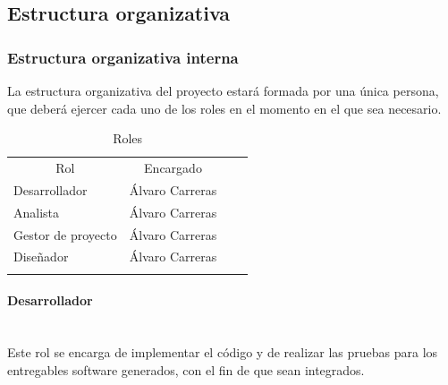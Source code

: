 \documentclass[twoside]{report}
\begin{document}
\subsection{Estructura organizativa}
\subsubsection{Estructura organizativa interna}
La estructura organizativa del proyecto estará formada por una única persona, que deberá ejercer cada uno de los roles en el momento en el que sea necesario. \cite{upedu} \vspace{0.5cm}

\begin{table}[H]
\begin{tabular}{llll}
\cline{1-2}
\multicolumn{1}{|c|}{Rol} & \multicolumn{1}{c|}{Encargado} &  &  \\ \cline{1-2}
\multicolumn{1}{|l|}{Desarrollador}                                      & \multicolumn{1}{l|}{Álvaro Carreras}                                          &  &  \\ \cline{1-2}
\multicolumn{1}{|l|}{Analista}                                           & \multicolumn{1}{l|}{Álvaro Carreras}                                          &  &  \\ \cline{1-2}
\multicolumn{1}{|l|}{Gestor de proyecto}                                 & \multicolumn{1}{l|}{Álvaro Carreras}                                          &  &  \\ \cline{1-2}
\multicolumn{1}{|l|}{Diseñador}                                          & \multicolumn{1}{l|}{Álvaro Carreras}                                                         &  &  \\ \cline{1-2}
                                                                         &                                                                               &  & 
\end{tabular}
\centering
\caption{Roles}
\end{table}
\vspace{0.5cm}

\paragraph{Desarrollador}\mbox{}\\

Este rol se encarga de implementar el código y de realizar las pruebas para los entregables software generados, con el fin de que sean integrados.
\end{document}

